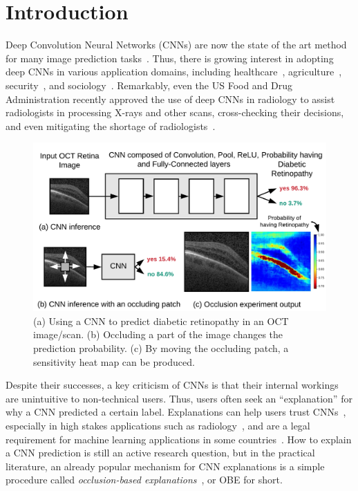 \section{Introduction}
Deep Convolution Neural Networks (CNNs) are now the state of the art method for many image prediction tasks~\cite{imagenet}. Thus, there is growing interest in adopting deep CNNs in various application domains, including healthcare~\cite{kermany2018identifying, islam2017abnormality}, agriculture~\cite{mohanty2016using}, security~\cite{arbabzadah2016identifying}, and sociology~\cite{wang2017deep}. Remarkably, even the US Food and Drug Administration recently approved the use of deep CNNs in radiology to assist radiologists in processing X-rays and other scans, cross-checking their decisions, and even mitigating the shortage of radiologists~\cite{fdaretinopathy,radiologistshortage}.

\begin{figure}[t]
\vspace{-4mm}
\includegraphics[width=\columnwidth]{./images/krypton_overview}
\caption{(a) Using a CNN to predict diabetic retinopathy in an OCT image/scan. (b) Occluding a part of the image changes the prediction probability. (c) By moving the occluding patch, a sensitivity heat map can be produced.}
\label{fig:krypton_overview}
\vspace{-4mm}
\end{figure}

Despite their successes, a key criticism of CNNs is that their internal workings are unintuitive to non-technical users. Thus, users often seek an ``explanation'' for why a CNN predicted a certain label. Explanations can help users trust CNNs~\cite{ribeiro2016should}, especially in high stakes applications such as radiology~\cite{jung2017deep}, and are a legal requirement for machine learning applications in some countries~\cite{gdpr}. How to explain a CNN prediction is still an active research question, but in the practical literature, an already popular mechanism for CNN explanations is a simple procedure called \textit{occlusion-based explanations}~\cite{zeiler2014visualizing}, or OBE for short.

